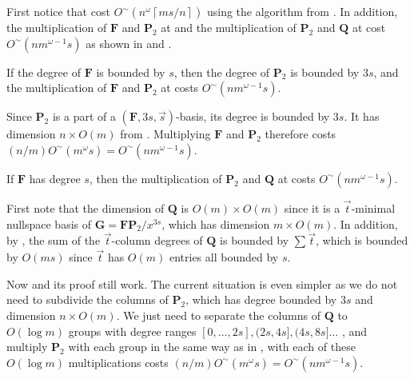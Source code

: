 First notice that  cost $O^{\sim}\left(n^{\omega}\left\lceil ms/n\right\rceil \right)$
using the algorithm from \citet{za2009}. In addition, the multiplication
of $\mathbf{F}$ and $\mathbf{P}_{2}$ at 
and the multiplication of $\mathbf{P}_{2}$ and $\mathbf{Q}$ at 
cost $O^{\sim}\left(nm^{\omega-1}s\right)$ as shown in 
and .
\begin{lem}
\label{lem:multiplyFP2WithUniformShift}If the degree of $\mathbf{F}$
is bounded by $s$, then the degree of $\mathbf{P}_{2}$ is bounded
by $3s$, and the multiplication of $\mathbf{F}$ and $\mathbf{P}_{2}$
at  costs \textup{$O^{\sim}\left(nm^{\omega-1}s\right)$.}\end{lem}
\begin{pf}
Since $\mathbf{P}_{2}$ is a part of a $\left(\mathbf{F},3s,\vec{s}\right)$-basis,
its degree is bounded by $3s$. It has dimension $n\times O\left(m\right)$
from .
Multiplying $\mathbf{F}$ and $\mathbf{P}_{2}$ therefore costs $(n/m)O^{\sim}\left(m^{\omega}s\right)=O^{\sim}\left(nm^{\omega-1}s\right)$.\end{pf}
\begin{lem}
\label{lem:multiplyP2QWithUniformShift}If $\mathbf{F}$ has degree
$s$, then the multiplication of $\mathbf{P}_{2}$ and $\mathbf{Q}$
at  costs \textup{$O^{\sim}\left(nm^{\omega-1}s\right)$.}\end{lem}
\begin{pf}
First note that the dimension of $\mathbf{Q}$ is $O\left(m\right)\times O\left(m\right)$
since it is a $\vec{t}$-minimal nullspace basis of $\mathbf{G}=\mathbf{F}\mathbf{P}_{2}/x^{3s}$,
which has dimension $m\times O\left(m\right)$. In addition, by ,
the sum of the $\vec{t}$-column degrees of $\mathbf{Q}$ is bounded
by $\sum\vec{t}$, which is bounded by $O\left(ms\right)$ since $\vec{t}$
has $O\left(m\right)$ entries all bounded by $s$.

Now  and its proof still
work. The current situation is even simpler as we do not need to subdivide
the columns of $\mathbf{P}_{2}$, which has degree bounded by $3s$
and dimension $n\times O\left(m\right)$. We just need to separate
the columns of $\mathbf{Q}$ to $O\left(\log m\right)$ groups with
degree ranges $\left[0,\dots,2s\right],(2s,4s],(4s,8s]\dots$ , and
multiply $\mathbf{P}_{2}$ with each group in the same way as in ,
with each of these $O\left(\log m\right)$ multiplications costs $(n/m)O^{\sim}\left(m^{\omega}s\right)=O^{\sim}\left(nm^{\omega-1}s\right)$.\end{pf}
